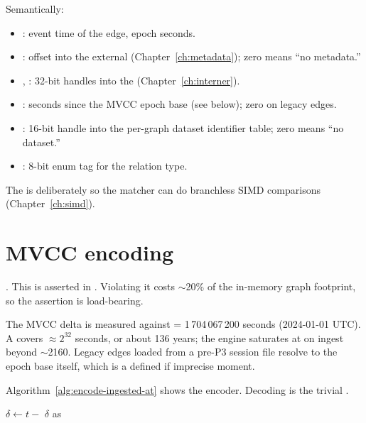 Semantically:
\begin{itemize}
    \item {}: event time of the edge, epoch seconds.
    \item {}: offset into the external
         (Chapter~\ref{ch:metadata}); zero
        means ``no metadata.''
    \item {}, : 32-bit handles into
        the  (Chapter~\ref{ch:interner}).
    \item {}: seconds since the MVCC epoch
        base (see below); zero on legacy edges.
    \item {}: 16-bit handle into the per-graph
         dataset identifier table; zero means ``no
        dataset.''
    \item {}: 8-bit enum tag for the relation
        type.
\end{itemize}

The  is deliberately  so the matcher
can do branchless SIMD comparisons (Chapter~\ref{ch:simd}).

\section{MVCC encoding}

\begin{invariant}
. This is asserted in
. Violating it costs $\sim$20\% of
the in-memory graph footprint, so the assertion is load-bearing.
\end{invariant}

The MVCC delta is measured against
 = 1\,704\,067\,200 seconds (2024-01-01
UTC). A  covers $\approx 2^{32}$ seconds, or about 136
years; the engine saturates at  on ingest beyond
$\sim$2160.  Legacy edges loaded from a pre-P3 session file
resolve to the epoch base itself, which is a defined if imprecise
moment.

Algorithm~\ref{alg:encode-ingested-at} shows the encoder. Decoding
is the trivial .

\begin{algorithm}
\caption{\textsc{Encode-Ingested-At}}\label{alg:encode-ingested-at}
$\delta \gets t - $ \;
\Return $\delta$ as \;
\end{algorithm}

